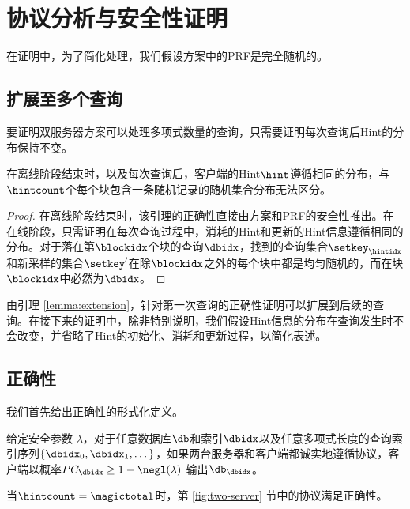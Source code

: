 \section{协议分析与安全性证明}
\label{sec:analysis}

在证明中，为了简化处理，我们假设方案中的PRF是完全随机的。

\subsection{扩展至多个查询}
\label{appendix:extension-to-multiple-queries}
要证明双服务器方案可以处理多项式数量的查询，只需要证明每次查询后Hint的分布保持不变。

\begin{lemma}
\label{lemma:extension}
在离线阶段结束时，以及每次查询后，客户端的Hint$\hint$遵循相同的分布，与$\hintcount$个每个块包含一条随机记录的随机集合分布无法区分。
\end{lemma}

\begin{proof}
在离线阶段结束时，该引理的正确性直接由方案和PRF的安全性推出。在在线阶段，只需证明在每次查询过程中，消耗的Hint和更新的Hint信息遵循相同的分布。对于落在第$\blockidx$个块的查询$\dbidx$，找到的查询集合$\setkey_\hintidx$和新采样的集合$\setkey'$在除$\blockidx$之外的每个块中都是均匀随机的，而在块$\blockidx$中必然为$\dbidx$。
\end{proof}

由引理 \ref{lemma:extension}，针对第一次查询的正确性证明可以扩展到后续的查询。在接下来的证明中，除非特别说明，我们假设Hint信息的分布在查询发生时不会改变，并省略了Hint的初始化、消耗和更新过程，以简化表述。

\subsection{正确性}

我们首先给出正确性的形式化定义。

\begin{definition}[双服务器方案的正确性]
给定安全参数 $\lambda$，对于任意数据库$\db$和索引$\dbidx$以及任意多项式长度的查询索引序列$\{\dbidx_0,\dbidx_1, \dots\}$，如果两台服务器和客户端都诚实地遵循协议，客户端以概率$PC_\dbidx \geq 1-\negl(\lambda)$ 输出$\db_\dbidx$。
\end{definition}

\begin{theorem}
    当$\hintcount=\magictotal$时，第 \ref{fig:two-server} 节中的协议满足正确性。
\end{theorem}


